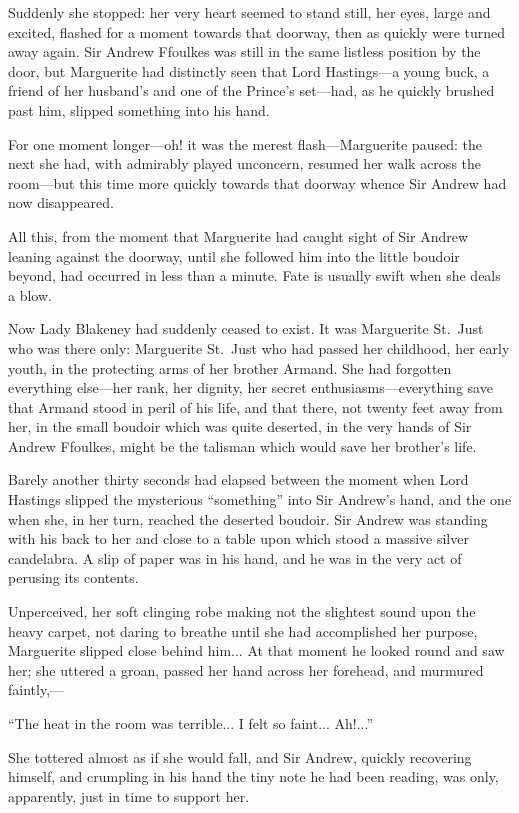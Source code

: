 \documentclass[paper=5.5in:8.5in,BCOR=7mm,twoside,DIV=calc,12pt,usegeometry,chapterprefix,endperiod,headings=big]{scrbook}
\begin{document}
Suddenly she stopped: her very heart seemed to stand still, her eyes, large and excited, flashed for a moment towards that doorway, then as quickly were turned away again. Sir Andrew Ffoulkes was still in the same listless position by the door, but Marguerite had distinctly seen that Lord Hastings---a young buck, a friend of her husband's and one of the Prince's set---had, as he quickly brushed past him, slipped something into his hand.

For one moment longer---oh! it was the merest flash---Marguerite paused: the next she had, with admirably played unconcern, resumed her walk across the room---but this time more quickly towards that doorway whence Sir Andrew had now disappeared.

All this, from the moment that Marguerite had caught sight of Sir Andrew leaning against the doorway, until she followed him into the little boudoir beyond, had occurred in less than a minute. Fate is usually swift when she deals a blow.

Now Lady Blakeney had suddenly ceased to exist. It was Marguerite St.~Just who was there only: Marguerite St.~Just who had passed her childhood, her early youth, in the protecting arms of her brother Armand. She had forgotten everything else---her rank, her dignity, her secret enthusiasms---everything save that Armand stood in peril of his life, and that there, not twenty feet away from her, in the small boudoir which was quite deserted, in the very hands of Sir Andrew Ffoulkes, might be the talisman which would save her brother's life.

Barely another thirty seconds had elapsed between the moment when Lord Hastings slipped the mysterious \enquote{something} into Sir Andrew's hand, and the one when she, in her turn, reached the deserted boudoir. Sir Andrew was standing with his back to her and close to a table upon which stood a massive silver candelabra. A slip of paper was in his hand, and he was in the very act of perusing its contents.

Unperceived, her soft clinging robe making not the slightest sound upon the heavy carpet, not daring to breathe until she had accomplished her purpose, Marguerite slipped close behind him... At that moment he looked round and saw her; she uttered a groan, passed her hand across her forehead, and murmured faintly,---

\enquote{The heat in the room was terrible... I felt so faint... Ah!...}

She tottered almost as if she would fall, and Sir Andrew, quickly recovering himself, and crumpling in his hand the tiny note he had been reading, was only, apparently, just in time to support her.
\end{document}
